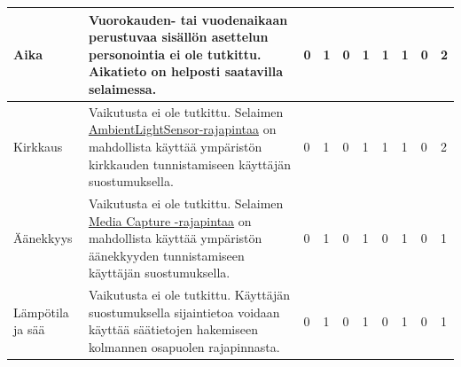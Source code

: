 \documentclass[finnish, 12pt, a4paper, elec, utf8, a-1b, online]{aaltothesis}
\begin{document}
{\begin{longtable}{p{2.5cm}|p{6cm}|p{0.5cm}p{0.5cm}p{0.5cm}|p{0.5cm}|p{0.5cm}p{0.5cm}p{0.5cm}|p{0.5cm}|}
    \midrule
    Aika                                   & Vuorokauden- tai vuodenaikaan perustuvaa sisällön asettelun personointia ei ole tutkittu. Aikatieto on helposti saatavilla selaimessa.                                                                                                                                                                                                  & 0                                          & 1                                   & 0                                      & 1                            & 1                                               & 1                                         & 0                                         & 2                            \\
    \midrule
    Kirkkaus                               & Vaikutusta ei ole tutkittu. Selaimen \href{https://developer.mozilla.org/en-US/docs/Web/API/AmbientLightSensor}{AmbientLightSensor-rajapintaa} on mahdollista käyttää ympäristön kirkkauden tunnistamiseen käyttäjän suostumuksella.                                                                                                    & 0                                          & 1                                   & 0                                      & 1                            & 1                                               & 1                                         & 0                                         & 2                            \\
    \midrule
    Äänekkyys                              & Vaikutusta ei ole tutkittu. Selaimen \href{https://developer.mozilla.org/en-US/docs/Web/API/Media_Streams_API}{Media Capture -rajapintaa} on mahdollista käyttää ympäristön äänekkyyden tunnistamiseen käyttäjän suostumuksella.                                                                                                        & 0                                          & 1                                   & 0                                      & 1                            & 0                                               & 1                                         & 0                                         & 1                            \\
    \midrule
    Lämpötila ja sää                       & Vaikutusta ei ole tutkittu. Käyttäjän suostumuksella sijaintietoa voidaan käyttää säätietojen hakemiseen kolmannen osapuolen rajapinnasta.                                                                                                                                                                                              & 0                                          & 1                                   & 0                                      & 1                            & 0                                               & 1                                         & 0                                         & 1                            \\

\end{longtable}}
\end{document}
